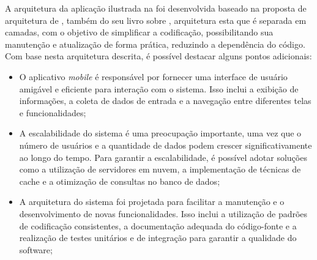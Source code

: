 A arquitetura da aplicação ilustrada na  foi desenvolvida baseado na proposta de arquitetura de \cite{martin2018arquitetura}, também do seu livro sobre , arquitetura esta que é separada em camadas, com o objetivo de simplificar a codificação, possibilitando sua manutenção e atualização de forma prática, reduzindo a dependência do código. Com base nesta arquitetura descrita, é possível destacar alguns pontos adicionais:

\begin{itemize}
   \item O aplicativo \textit{mobile} é responsável por fornecer uma interface de usuário amigável e eficiente para interação com o sistema. Isso inclui a exibição de informações, a coleta de dados de entrada e a navegação entre diferentes telas e funcionalidades;
   \item A escalabilidade do sistema é uma preocupação importante, uma vez que o número de usuários e a quantidade de dados podem crescer significativamente ao longo do tempo. Para garantir a escalabilidade, é possível adotar soluções como a utilização de servidores em nuvem, a implementação de técnicas de cache e a otimização de consultas no banco de dados;
   \item A arquitetura do sistema foi projetada para facilitar a manutenção e o desenvolvimento de novas funcionalidades. Isso inclui a utilização de padrões de codificação consistentes, a documentação adequada do código-fonte e a realização de testes unitários e de integração para garantir a qualidade do software;
 \end{itemize}

